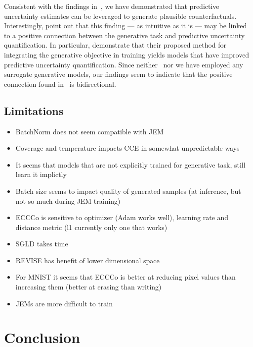 \documentclass{article}
\begin{document}
Consistent with the findings in~\citet{schut2021generating}, we have demonstrated that predictive uncertainty estimates can be leveraged to generate plausible counterfactuals. Interestingly, \citet{schut2021generating} point out that this finding --- as intuitive as it is --- may be linked to a positive connection between the generative task and predictive uncertainty quantification. In particular, \citet{grathwohl2020your} demonstrate that their proposed method for integrating the generative objective in training yields models that have improved predictive uncertainty quantification. Since neither~\citet{schut2021generating} nor we have employed any surrogate generative models, our findings seem to indicate that the positive connection found in~\citet{grathwohl2020your} is bidirectional.

\subsection{Limitations}

\begin{itemize}
  \item BatchNorm does not seem compatible with JEM
  \item Coverage and temperature impacts CCE in somewhat unpredictable ways
  \item It seems that models that are not explicitly trained for generative task, still learn it implictly
  \item Batch size seems to impact quality of generated samples (at inference, but not so much during JEM training)
  \item ECCCo is sensitive to optimizer (Adam works well), learning rate and distance metric (l1 currently only one that works)
  \item SGLD takes time 
  \item REVISE has benefit of lower dimensional space
  \item For MNIST it seems that ECCCo is better at reducing pixel values than increasing them (better at erasing than writing)
  \item JEMs are more difficult to train
\end{itemize}

\section{Conclusion}

\medskip


\end{document}
